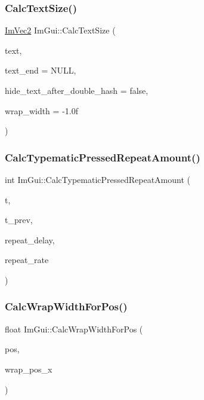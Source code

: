 \hypertarget{namespace_im_gui_a848b9db6cc4a186751c0ecebcaadc33b}{}\label{namespace_im_gui_a848b9db6cc4a186751c0ecebcaadc33b} 
\subsubsection{\texorpdfstring{Calc\+Text\+Size()}{CalcTextSize()}}
{\footnotesize\ttfamily \hyperlink{struct_im_vec2}{Im\+Vec2} Im\+Gui\+::\+Calc\+Text\+Size (\begin{DoxyParamCaption}\item[{const char $\ast$}]{text,  }\item[{const char $\ast$}]{text\+\_\+end = {\ttfamily NULL},  }\item[{bool}]{hide\+\_\+text\+\_\+after\+\_\+double\+\_\+hash = {\ttfamily false},  }\item[{float}]{wrap\+\_\+width = {\ttfamily -\/1.0f} }\end{DoxyParamCaption})}

\hypertarget{namespace_im_gui_ad3af0fc327467a44116d7d04018b9124}{}\label{namespace_im_gui_ad3af0fc327467a44116d7d04018b9124} 
\subsubsection{\texorpdfstring{Calc\+Typematic\+Pressed\+Repeat\+Amount()}{CalcTypematicPressedRepeatAmount()}}
{\footnotesize\ttfamily int Im\+Gui\+::\+Calc\+Typematic\+Pressed\+Repeat\+Amount (\begin{DoxyParamCaption}\item[{float}]{t,  }\item[{float}]{t\+\_\+prev,  }\item[{float}]{repeat\+\_\+delay,  }\item[{float}]{repeat\+\_\+rate }\end{DoxyParamCaption})}

\hypertarget{namespace_im_gui_a66416151e58c34cd02973976de66e0e9}{}\label{namespace_im_gui_a66416151e58c34cd02973976de66e0e9} 
\subsubsection{\texorpdfstring{Calc\+Wrap\+Width\+For\+Pos()}{CalcWrapWidthForPos()}}
{\footnotesize\ttfamily float Im\+Gui\+::\+Calc\+Wrap\+Width\+For\+Pos (\begin{DoxyParamCaption}\item[{const \hyperlink{struct_im_vec2}{Im\+Vec2} \&}]{pos,  }\item[{float}]{wrap\+\_\+pos\+\_\+x }\end{DoxyParamCaption})}

